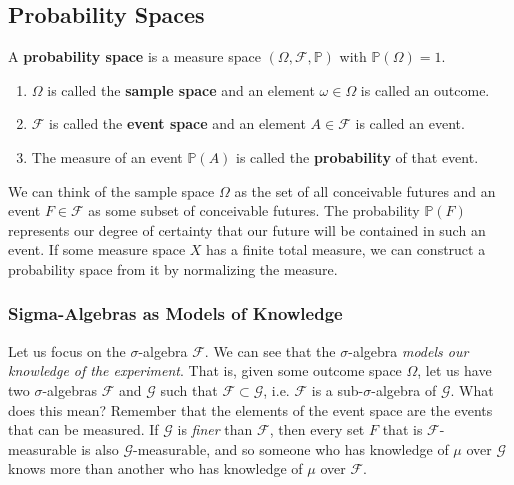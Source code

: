 \documentclass{article}
\begin{document}
  \subsection{Probability Spaces}

    \begin{definition}
      A \textbf{probability space} is a measure space $(\Omega, \mathcal{F}, \mathbb{P})$ with $\mathbb{P}(\Omega) = 1$. 
      \begin{enumerate}
        \item $\Omega$ is called the \textbf{sample space} and an element $\omega \in \Omega$ is called an outcome. 
        \item $\mathcal{F}$ is called the \textbf{event space} and an element $A \in \mathcal{F}$ is called an event. 
        \item The measure of an event $\mathbb{P}(A)$ is called the \textbf{probability} of that event. 
      \end{enumerate}
      We can think of the sample space $\Omega$ as the set of all conceivable futures and an event $F \in \mathcal{F}$ as some subset of conceivable futures. The probability $\mathbb{P}(F)$ represents our degree of certainty that our future will be contained in such an event. If some measure space $X$ has a finite total measure, we can construct a probability space from it by normalizing the measure. 
    \end{definition}

    \subsubsection{Sigma-Algebras as Models of Knowledge}

      Let us focus on the $\sigma$-algebra $\mathcal{F}$. We can see that the $\sigma$-algebra \textit{models our knowledge of the experiment}. That is, given some outcome space $\Omega$, let us have two $\sigma$-algebras $\mathcal{F}$ and $\mathcal{G}$ such that $\mathcal{F} \subset \mathcal{G}$, i.e. $\mathcal{F}$ is a sub-$\sigma$-algebra of $\mathcal{G}$. What does this mean? Remember that the elements of the event space are the events that can be measured. If $\mathcal{G}$ is \textit{finer} than $\mathcal{F}$, then every set $F$ that is $\mathcal{F}$-measurable is also $\mathcal{G}$-measurable, and so someone who has knowledge of $\mu$ over $\mathcal{G}$ knows more than another who has knowledge of $\mu$ over $\mathcal{F}$. 
\end{document}
